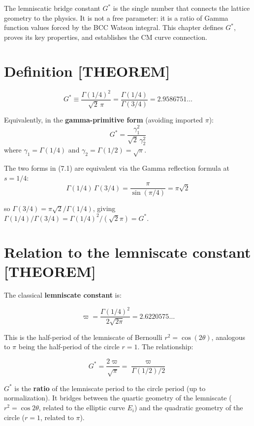 \documentclass[
  11pt,
  letterpaper,
  twoside,
  openany]{book}
\makeatletter
\let\orig@section\section
\renewcommand{\section}{\needspace{8\baselineskip}\orig@section}
\newcommand{\Gs}{G^{*}{}}
\makeatother
\begin{document}
The lemniscatic bridge constant \(\Gs\) is the single number that
connects the lattice geometry to the physics. It is not a free
parameter: it is a ratio of Gamma function values forced by the BCC
Watson integral. This chapter defines \(\Gs\), proves its key
properties, and establishes the CM curve connection.

\section{Definition {[}THEOREM{]}}\label{definition-theorem}

\begin{ftddefinition}

\[
\Gs \equiv \frac{\Gamma(1/4)^2}{\sqrt{2}\,\pi} = \frac{\Gamma(1/4)}{\Gamma(3/4)} = 2.9586751\ldots
\tag{7.1}
\]

Equivalently, in the \textbf{gamma-primitive form} (avoiding imported
\(\pi\)): \[
\Gs = \frac{\gamma_1^2}{\sqrt{2}\,\gamma_2^2}
\] where \(\gamma_1 = \Gamma(1/4)\) and
\(\gamma_2 = \Gamma(1/2) = \sqrt{\pi}\).

\end{ftddefinition}

The two forms in (7.1) are equivalent via the Gamma reflection formula
at \(s = 1/4\): \[
\Gamma(1/4)\,\Gamma(3/4) = \frac{\pi}{\sin(\pi/4)} = \pi\sqrt{2}
\]

so \(\Gamma(3/4) = \pi\sqrt{2}/\Gamma(1/4)\), giving
\(\Gamma(1/4)/\Gamma(3/4) = \Gamma(1/4)^2/(\sqrt{2}\pi) = \Gs\).

\section{Relation to the lemniscate constant
{[}THEOREM{]}}\label{relation-to-the-lemniscate-constant-theorem}

The classical \textbf{lemniscate constant} is:

\[
\varpi = \frac{\Gamma(1/4)^2}{2\sqrt{2\pi}} = 2.6220575\ldots
\tag{7.2}
\]

This is the half-period of the lemniscate of Bernoulli
\(r^2 = \cos(2\theta)\), analogous to \(\pi\) being the half-period of
the circle \(r = 1\). The relationship:

\[
\Gs = \frac{2\varpi}{\sqrt{\pi}} = \frac{\varpi}{\Gamma(1/2)/2}
\tag{7.3}
\]

\(\Gs\) is the \textbf{ratio} of the lemniscate period to the circle
period (up to normalization). It bridges between the quartic geometry of
the lemniscate (\(r^2 = \cos 2\theta\), related to the elliptic curve
\(E_i\)) and the quadratic geometry of the circle (\(r = 1\), related to
\(\pi\)).
\end{document}
